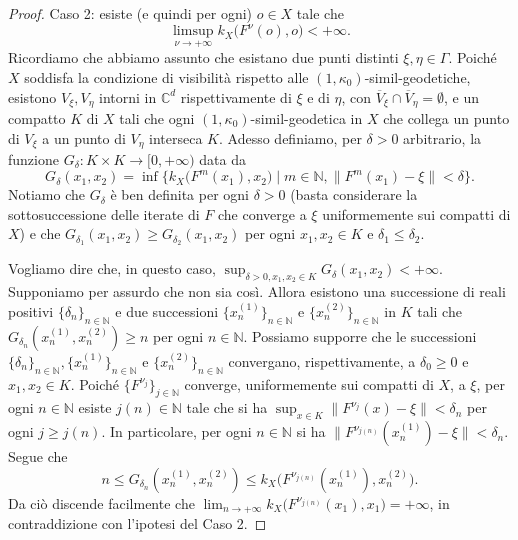 \begin{proof}
    Caso 2: esiste (e quindi per ogni) $o \in X$ tale che
    $$\limsup_{\nu\longrightarrow+\infty} k_X\big(F^\nu(o),o\big)<+\infty.$$
    Ricordiamo che abbiamo assunto che esistano due punti distinti $\xi,\eta\in\Gamma$. Poiché $X$ soddisfa la condizione di visibilità rispetto alle $(1,\kappa_0)$-simil-geodetiche, esistono $V_\xi, V_\eta$ intorni in $\mathbb{C}^d$ rispettivamente di $\xi$ e di $\eta$, con $\overline{V}_\xi\cap\overline{V}_\eta=\emptyset$, e un compatto $K$ di $X$ tali che ogni $(1,\kappa_0)$-simil-geodetica in $X$ che collega un punto di $V_\xi$ a un punto di $V_\eta$ interseca $K$.
    Adesso definiamo, per $\delta>0$ arbitrario, la funzione $G_\delta:K\times K\longrightarrow [0,+\infty)$ data da
    $$G_\delta(x_1,x_2)=\inf\{k_X\big(F^m(x_1),x_2\big)\mid m\in\mathbb{N}, \|F^m(x_1)-\xi\|<\delta\}.$$
    Notiamo che $G_\delta$ è ben definita per ogni $\delta>0$ (basta considerare la sottosuccessione delle iterate di $F$ che converge a $\xi$ uniformemente sui compatti di $X$) e che $G_{\delta_1}(x_1,x_2) \ge G_{\delta_2}(x_1,x_2)$ per ogni $x_1,x_2 \in K$ e $\delta_1 \le \delta_2$.
    
    Vogliamo dire che, in questo caso, $\displaystyle\sup_{\delta>0,x_1,x_2\in K}G_\delta(x_1,x_2)<+\infty$. Supponiamo per assurdo che non sia così. Allora esistono una successione di reali positivi $\{\delta_n\}_{n\in\mathbb{N}}$ e due successioni $\{x_n^{(1)}\}_{n\in\mathbb{N}}$ e $\{x_n^{(2)}\}_{n\in\mathbb{N}}$ in $K$ tali che $G_{\delta_n}(x_n^{(1)},x_n^{(2)}) \ge n$ per ogni $n\in\mathbb{N}$. Possiamo supporre che le successioni $\{\delta_n\}_{n\in\mathbb{N}}, \{x_n^{(1)}\}_{n\in\mathbb{N}}$ e $\{x_n^{(2)}\}_{n\in\mathbb{N}}$ convergano, rispettivamente, a $\delta_0 \ge 0$ e $x_1,x_2\in K$. Poiché $\{F^{\nu_j}\}_{j\in\mathbb{N}}$ converge, uniformemente sui compatti di $X$, a $\xi$, per ogni $n\in\mathbb{N}$ esiste $j(n)\in\mathbb{N}$ tale che si ha $\displaystyle\sup_{x\in K}\|F^{\nu_j}(x)-\xi\|<\delta_n$ per ogni $j \ge j(n)$. In particolare, per ogni $n \in \mathbb{N}$ si ha $\|F^{\nu_{j(n)}}(x_n^{(1)})-\xi\|<\delta_n$. Segue che
    $$n \le G_{\delta_n}(x_n^{(1)},x_n^{(2)}) \le k_X\big(F^{\nu_{j(n)}}(x_n^{(1)}),x_n^{(2)}\big).$$
    Da ciò discende facilmente che $\displaystyle\lim_{n\longrightarrow+\infty}k_X\big(F^{\nu_{j(n)}}(x_1),x_1\big)=+\infty$, in contraddizione con l'ipotesi del Caso 2.


\end{proof}
